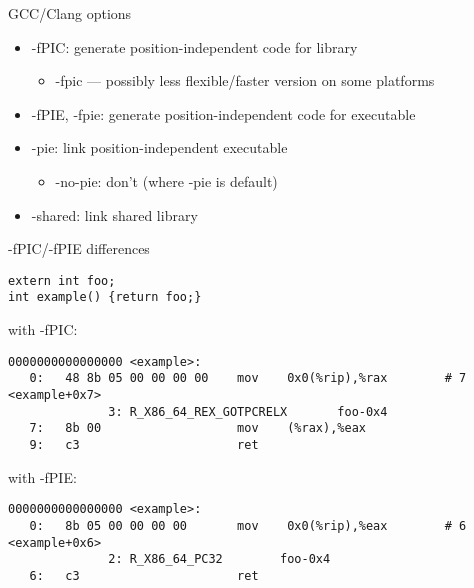 
\begin{frame}{GCC/Clang options}
    \begin{itemize}
    \item -fPIC: generate position-independent code for library
        \begin{itemize}
        \item -fpic --- possibly less flexible/faster version on some platforms
        \end{itemize}
    \item -fPIE, -fpie: generate position-independent code for executable
    \item -pie: link position-independent executable
        \begin{itemize}
        \item -no-pie: don't (where -pie is default)
        \end{itemize}
    \item -shared: link shared library
    \end{itemize}
\end{frame}

\begin{frame}[fragile]{-fPIC/-fPIE differences}
\begin{Verbatim}[fontsize=\small]
extern int foo;
int example() {return foo;}
\end{Verbatim}
with -fPIC:
\begin{Verbatim}[fontsize=\small]
0000000000000000 <example>:
   0:   48 8b 05 00 00 00 00    mov    0x0(%rip),%rax        # 7 <example+0x7>
              3: R_X86_64_REX_GOTPCRELX       foo-0x4
   7:   8b 00                   mov    (%rax),%eax
   9:   c3                      ret
\end{Verbatim}
with -fPIE:
\begin{Verbatim}[fontsize=\small]
0000000000000000 <example>: 
   0:   8b 05 00 00 00 00       mov    0x0(%rip),%eax        # 6 <example+0x6>
              2: R_X86_64_PC32        foo-0x4
   6:   c3                      ret
\end{Verbatim}
\end{frame}

